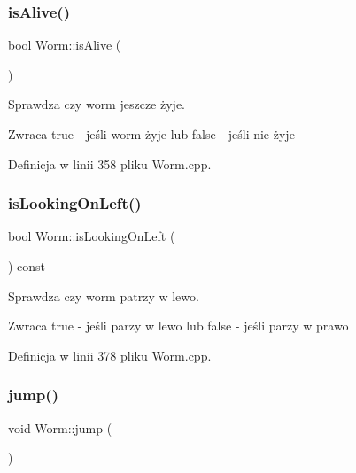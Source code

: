 \subsubsection{\texorpdfstring{is\+Alive()}{isAlive()}}
{\footnotesize\ttfamily bool Worm\+::is\+Alive (\begin{DoxyParamCaption}{ }\end{DoxyParamCaption})}



Sprawdza czy worm jeszcze żyje. 

\begin{DoxyReturn}{Zwraca}
true -\/ jeśli worm żyje lub false -\/ jeśli nie żyje 
\end{DoxyReturn}


Definicja w linii 358 pliku Worm.\+cpp.

\mbox{\label{class_worm_a3a90a91ddbe99e67f48e54a57d12b5c7}} 
\subsubsection{\texorpdfstring{is\+Looking\+On\+Left()}{isLookingOnLeft()}}
{\footnotesize\ttfamily bool Worm\+::is\+Looking\+On\+Left (\begin{DoxyParamCaption}{ }\end{DoxyParamCaption}) const}



Sprawdza czy worm patrzy w lewo. 

\begin{DoxyReturn}{Zwraca}
true -\/ jeśli parzy w lewo lub false -\/ jeśli parzy w prawo 
\end{DoxyReturn}


Definicja w linii 378 pliku Worm.\+cpp.

\mbox{\label{class_worm_ae4cd763e0edd18cecab42b39142cea14}} 
\subsubsection{\texorpdfstring{jump()}{jump()}}
{\footnotesize\ttfamily void Worm\+::jump (\begin{DoxyParamCaption}{ }\end{DoxyParamCaption})}



